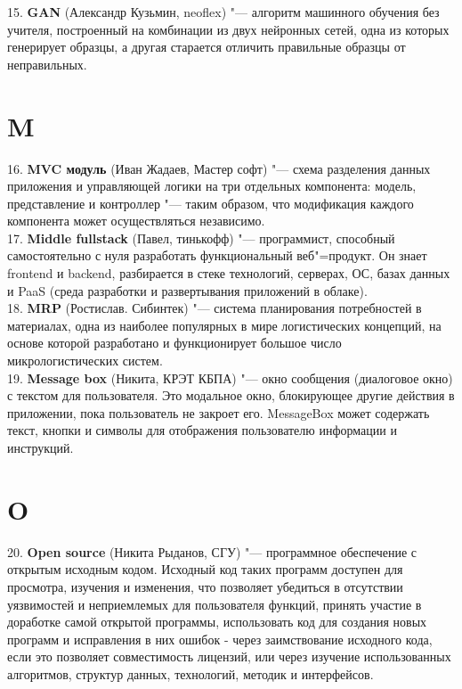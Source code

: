 \documentclass[14 pt]{extarticle}
\begin{document}
    15. \textbf{GAN} (Александр Кузьмин, neoflex) "--- алгоритм машинного обучения без учителя, построенный на комбинации из двух нейронных сетей, одна из которых генерирует образцы, а другая старается отличить правильные образцы от неправильных.
    
\section*{M}
    16. \textbf{MVC модуль} (Иван Жадаев, Мастер софт) "--- схема разделения данных приложения и управляющей логики на три отдельных компонента: модель, представление и контроллер "--- таким образом, что модификация каждого компонента может осуществляться независимо. \\
    
    17. \textbf{Middle fullstack} (Павел, тинькофф) "--- программист, способный самостоятельно с нуля разработать функциональный веб"=продукт. Он знает frontend и backend, разбирается в стеке технологий, серверах, ОС, базах данных и PaaS (среда разработки и развертывания приложений в облаке). \\
    
    18. \textbf{MRP} (Ростислав. Сибинтек) "--- система планирования потребностей в материалах, одна из наиболее популярных в мире логистических концепций, на основе которой разработано и функционирует большое число микрологистических систем. \\
    
    19. \textbf{Message box} (Никита, КРЭТ КБПА) "--- окно сообщения (диалоговое окно) с текстом для пользователя. Это модальное окно, блокирующее другие действия в приложении, пока пользователь не закроет его. MessageBox может содержать текст, кнопки и символы для отображения пользователю информации и инструкций. \\
    
\section*{O}
    20. \textbf{Open source} (Никита Рыданов, СГУ) "--- программное обеспечение с открытым исходным кодом. Исходный код таких программ доступен для просмотра, изучения и изменения, что позволяет убедиться в отсутствии уязвимостей и неприемлемых для пользователя функций, принять участие в доработке самой открытой программы, использовать код для создания новых программ и исправления в них ошибок - через заимствование исходного кода, если это позволяет совместимость лицензий, или через изучение использованных алгоритмов, структур данных, технологий, методик и интерфейсов. \\
    
\end{document}
